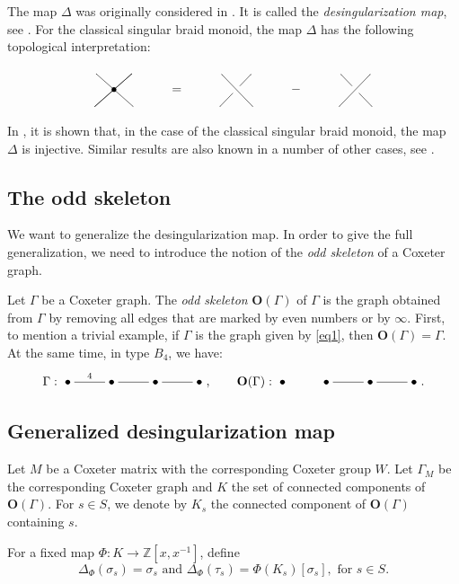 \documentclass[a4paper]{amsart}
\begin{document}
The map $\Delta$ was originally considered in \cite{Ba92}. It
is called the {\em desingularization map}, see \cite{Bi93}.
For the classical singular braid monoid, the map $\Delta$ has the following
topological interpretation:
\begin{displaymath}
\xymatrix@C=3mm@R=2mm{
\ar@{-}[ddrr]&&\ar@{-}[ddll]\ar@{-}[ddll]&&&&
\ar@{-}[ddrr]&&\ar@{-}[ddll]|\hole&&&&\ar@{-}[ddrr]|\hole&&\ar@{-}[ddll]\\
&\bullet&&&=&&&&&&-&&&&\\
&&&&&&&&&&&&&&
}
\end{displaymath}
In \cite{Pa04}, it is shown that, in the case of the classical singular
braid monoid, the map $\Delta$ is injective. Similar results are also known
in a number of other cases, see \cite{GP05,Ea06}.

\subsection{The odd skeleton}\label{s3.2}

We want to generalize the desingularization map. In order to give 
the full generalization, we need to introduce the notion of the
{\em odd skeleton} of a Coxeter graph.

Let $\Gamma$ be a Coxeter graph. The {\em odd skeleton} $\mathbf{O}(\Gamma)$
of $\Gamma$ is the graph obtained from $\Gamma$ by removing all edges that 
are marked by even numbers or by $\infty$. First, to mention a trivial example, 
if  $\Gamma$ is the graph given by \eqref{eq1}, then 
$\mathbf{O}(\Gamma)=\Gamma$. At the same time, in type $B_4$, we have:
\begin{displaymath}
\Gamma:\xymatrix{\bullet\ar@{-}[r]^4&\bullet\ar@{-}[r]&\bullet\ar@{-}[r]&\bullet},
\qquad
\mathbf{O}(\Gamma):
\xymatrix{\bullet&\bullet\ar@{-}[r]&\bullet\ar@{-}[r]&\bullet}.
\end{displaymath}

\subsection{Generalized desingularization map}\label{s3.3}

Let $M$ be a Coxeter matrix with the corresponding Coxeter group $W$. 
Let $\Gamma_M$ be the corresponding Coxeter graph
and $K$ the set of connected components of $\mathbf{O}(\Gamma)$.
For $s\in S$, we denote by $K_s$ the connected component of $\mathbf{O}(\Gamma)$
containing $s$. 

For a fixed map $\Phi:K\to \mathbb{Z}[x,x^{-1}]$, define
\begin{displaymath}
\Delta_\Phi(\sigma_s)=\sigma_s\text{ and }
\Delta_\Phi(\tau_s)=\Phi(K_s)[\sigma_s],\text{ for }s\in S.
\end{displaymath}
\end{document}
